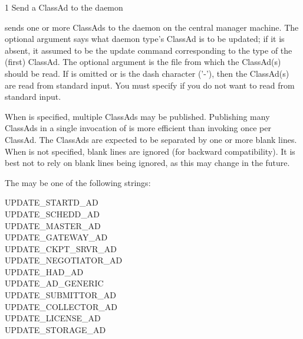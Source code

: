 \begin{ManPage}{\label{man-condor-advertise}}{1}
{Send a ClassAd to the  daemon}

\Synopsis {}
\ToolArgsBase


\Description
{} sends one or more ClassAds to the 
daemon on the central manager machine.
The optional argument  says what daemon type's ClassAd
is to be updated; if it is absent, it assumed to be the update command
corresponding to the type of the (first) ClassAd.
The optional argument  is the file from which the
ClassAd(s) should be read.
If  is omitted or is the dash character ('-'),
then the ClassAd(s) are read from standard input.
You must specify  if you do not want to read from
standard input.

When  is specified, multiple ClassAds may be published.
Publishing many ClassAds in a single invocation of  is
more efficient than invoking  once per ClassAd.
The ClassAds are expected to be separated by one or more blank lines.
When  is not specified, blank lines are ignored (for
backward compatibility).  
It is best not to rely on blank lines being ignored,
as this may change in the future.

The  may be one of the following strings:
\begin{description}
\item[UPDATE\_STARTD\_AD]
\item[UPDATE\_SCHEDD\_AD]
\item[UPDATE\_MASTER\_AD]
\item[UPDATE\_GATEWAY\_AD]
\item[UPDATE\_CKPT\_SRVR\_AD]
\item[UPDATE\_NEGOTIATOR\_AD]
\item[UPDATE\_HAD\_AD]
\item[UPDATE\_AD\_GENERIC]
\item[UPDATE\_SUBMITTOR\_AD]
\item[UPDATE\_COLLECTOR\_AD]
\item[UPDATE\_LICENSE\_AD]
\item[UPDATE\_STORAGE\_AD]
\end{description}


\end{ManPage}
